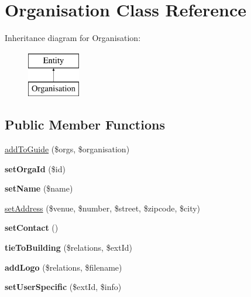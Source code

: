 \hypertarget{classOrganisation}{
\section{Organisation Class Reference}
\label{classOrganisation}
}
Inheritance diagram for Organisation:\begin{figure}[H]
\begin{center}
\leavevmode
\includegraphics[height=2.000000cm]{classOrganisation}
\end{center}
\end{figure}
\subsection*{Public Member Functions}
\begin{DoxyCompactItemize}
\item 
\hyperlink{classOrganisation_a5507fc4f9b73c75a887e3ea9b482c99d}{addToGuide} (\$orgs, \$organisation)
\item 
\hypertarget{classOrganisation_a7dfe2c2759ec4e3be7d97e691cfa02e8}{
{\bfseries setOrgaId} (\$id)}
\label{classOrganisation_a7dfe2c2759ec4e3be7d97e691cfa02e8}

\item 
\hypertarget{classOrganisation_afacd8b4325f0cc73668ee7e3f091df82}{
{\bfseries setName} (\$name)}
\label{classOrganisation_afacd8b4325f0cc73668ee7e3f091df82}

\item 
\hyperlink{classOrganisation_a71d35bcc06e83b24910510a8b59be5d4}{setAddress} (\$venue, \$number, \$street, \$zipcode, \$city)
\item 
\hypertarget{classOrganisation_ad15685d1fa3607ec5d76cc867a274aec}{
{\bfseries setContact} ()}
\label{classOrganisation_ad15685d1fa3607ec5d76cc867a274aec}

\item 
\hypertarget{classOrganisation_aa308e39c129d3e96c6e2b99a781c6de3}{
{\bfseries tieToBuilding} (\$relations, \$extId)}
\label{classOrganisation_aa308e39c129d3e96c6e2b99a781c6de3}

\item 
\hypertarget{classOrganisation_a433e9b6908d6151b251f6487b80bbe42}{
{\bfseries addLogo} (\$relations, \$filename)}
\label{classOrganisation_a433e9b6908d6151b251f6487b80bbe42}

\item 
\hypertarget{classOrganisation_aa0965482007ed6f41dfb779a72e26456}{
{\bfseries setUserSpecific} (\$extId, \$info)}
\label{classOrganisation_aa0965482007ed6f41dfb779a72e26456}

\end{DoxyCompactItemize}
